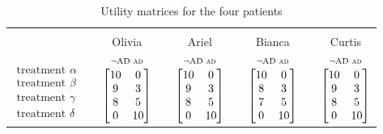 \documentclass[utf8]{FrontiersinHarvard} %
\renewcommand*{\|}[1][]{\nonscript\:#1\vert\nonscript\:\mathopen{}}
\newcommand*{\AD}{\textsc{ad}}
\newcommand*{\nAD}{\lnot\mathrm{AD}}
\begin{document}
\medskip
\begin{table}[!h]
  \centering
  \begin{tabular}{lccccccc}
    \hline\\[-1.5\jot]
    &{\small Olivia} &&{\small Ariel} &&{\small Bianca} &&{\small Curtis}
    \\[\jot]
    $\begin{matrix}&\\
      \text{treatment }\alpha\\ 
      \text{treatment }\beta\\ 
      \text{treatment }\gamma\\ 
      \text{treatment }\delta
    \end{matrix}$
    &
    $
    \begin{gathered}
      \begin{smallmatrix}
        \nAD&\AD
      \end{smallmatrix}\\[-\jot]
\begin{bmatrix}10&0\\9&3\\8&5\\0&10\end{bmatrix}
\end{gathered}
$
    &&
    $\begin{gathered}
      \begin{smallmatrix}
        \nAD&\AD
      \end{smallmatrix}\\[-\jot]
      \begin{bmatrix}10&0\\9&3\\8&5\\0&10\end{bmatrix}\end{gathered}$
    &&
    $\begin{gathered}
      \begin{smallmatrix}
        \nAD&\AD
      \end{smallmatrix}\\[-\jot]
      \begin{bmatrix}10&0\\8&3\\7&5\\0&10\end{bmatrix}\end{gathered}$
    &&
    $\begin{gathered}
      \begin{smallmatrix}
        \nAD&\AD
      \end{smallmatrix}\\[-\jot]
      \begin{bmatrix}10&0\\9&3\\8&5\\0&10\end{bmatrix}\end{gathered}$
    \\[6\jot]
    \hline
  \end{tabular}
  \caption{Utility matrices for the four patients}\label{tab:utilities_patients}
\end{table}
\end{document}
